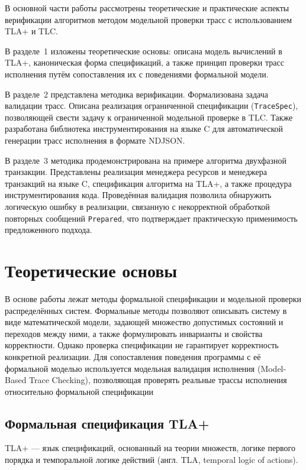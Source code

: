 
В основной части работы рассмотрены теоретические и практические аспекты
верификации алгоритмов методом модельной проверки трасс с использованием TLA+ и
TLC.

В разделе~1 изложены теоретические основы: описана модель вычислений в TLA+,
каноническая форма спецификаций, а также принцип проверки трасс исполнения
путём сопоставления их с поведениями формальной модели.

В разделе~2 представлена методика верификации. Формализована задача валидации
трасс. Описана реализация ограниченной спецификации (\texttt{TraceSpec}),
позволяющей свести задачу к ограниченной модельной проверке в TLC. Также
разработана библиотека инструментирования на языке C для автоматической
генерации трасс исполнения в формате NDJSON.

В разделе~3 методика продемонстрирована на примере алгоритма двухфазной
транзакции. Представлены реализация менеджера ресурсов и менеджера транзакций
на языке C, спецификация алгоритма на TLA+, а также процедура
инструментирования кода. Проведённая валидация позволила обнаружить логическую
ошибку в реализации, связанную с некорректной обработкой повторных сообщений
\texttt{Prepared}, что подтверждает практическую применимость предложенного
подхода.

\section{Теоретические основы}

В основе работы лежат методы формальной спецификации и модельной проверки
распределённых систем. Формальные методы позволяют описывать систему в виде
математической модели, задающей множество допустимых состояний и переходов
между ними, а также формулировать инварианты и свойства корректности. Однако
проверка спецификации не гарантирует корректность конкретной реализации. Для
сопоставления поведения программы с её формальной моделью используется
модельная валидация исполнения (Model-Based Trace Checking), позволяющая
проверять реальные трассы исполнения относительно формальной спецификации

\subsection{Формальная спецификация TLA+}

TLA+ — язык спецификаций, основанный на теории множеств, логике первого порядка
и темпоральной логике действий (англ. TLA, temporal logic of actions).

